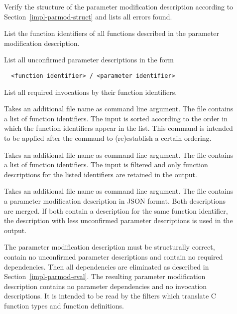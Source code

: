 \begin{description}

\item[]
Verify the structure of the parameter modification description 
according to Section~\ref{impl-parmod-struct} and lists all errors found.

\item[]
List the function identifiers of all functions described in the parameter modification description.

\item[] 
List all unconfirmed parameter descriptions in the form
\begin{verbatim}
  <function identifier> / <parameter identifier>
\end{verbatim}

\item[]
List all required invocations by their function identifiers.

\item[]
Takes an additional file name as command line argument. The file contains a list of function identifiers.
The input is sorted according to the order in which the function identifiers appear in the list. This command
is intended to be applied after the  command to (re)establish a certain ordering.

\item[]
Takes an additional file name as command line argument. The file contains a list of function identifiers.
The input is filtered and only function descriptions for the listed identifiers are retained in the output.

\item[]
Takes an additional file name as command line argument. The file contains a parameter modification description 
in JSON format. Both descriptions are merged. If both contain a description for the same function identifier,
the description with less unconfirmed parameter descriptions is used in the output.

\item[]
The parameter modification description must be structurally correct, contain no
unconfirmed parameter descriptions and contain no required dependencies. Then all dependencies are eliminated 
as described in Section~\ref{impl-parmod-eval}.
The resulting parameter modification description contains no parameter dependencies and
no invocation descriptions. It is intended to be read by the filters which translate C function types and function 
definitions.
\end{description}

